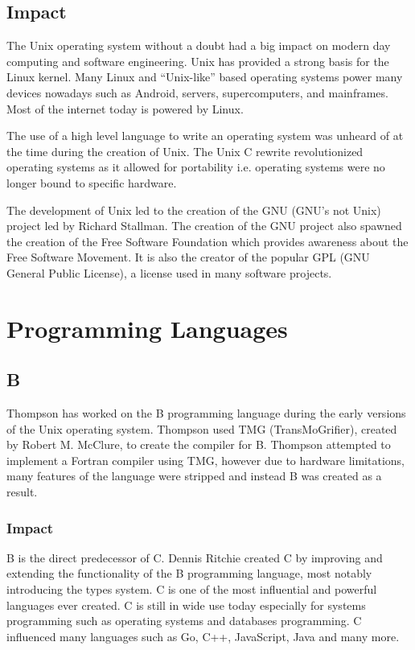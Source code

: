 \documentclass{article}
\begin{document}
\subsection{Impact}
The Unix operating system without a doubt had a big impact on modern day
computing and software engineering. Unix has provided a strong basis for the
Linux kernel. Many Linux and ``Unix-like'' based operating systems power many
devices nowadays such as Android, servers, supercomputers, and mainframes. Most
of the internet today is powered by Linux.

The use of a high level language to write an operating system was unheard of at
the time during the creation of Unix. The Unix C rewrite revolutionized
operating systems as it allowed for portability i.e. operating systems were no
longer bound to specific hardware.

The development of Unix led to the creation of the GNU (GNU's not Unix) project
led by Richard Stallman. The creation of the GNU project also spawned the
creation of the Free Software Foundation which provides awareness about the
Free Software Movement. It is also the creator of the popular GPL (GNU General
Public License), a license used in many software projects.

\section{Programming Languages}
\subsection{B}
Thompson has worked on the B programming language during the early versions of
the Unix operating system. Thompson used TMG (TransMoGrifier), created by
Robert M. McClure, to create the compiler for B.  Thompson attempted to
implement a Fortran compiler using TMG, however due to hardware limitations,
many features of the language were stripped and instead B was created as a
result.\cite{VCF}

\subsubsection{Impact}
B is the direct predecessor of C. Dennis Ritchie created C by improving and
extending the functionality of the B programming language, most notably
introducing the types system. C is one of the most influential and powerful
languages ever created. C is still in wide use today especially for systems
programming such as operating systems and databases programming. C influenced
many languages such as Go, C++, JavaScript, Java and many more.
\end{document}
